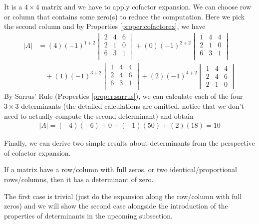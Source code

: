\begin{solution}
It is a $4 \times 4$ matrix and we have to apply cofactor expansion. We can choose row or column that contains some zero(s) to reduce the computation. Here we pick the second column and by Properties \ref{proper:cofactorex}, we have
\begin{align*}
|A| &= (4)(-1)^{1+2}
\begin{vmatrix}
2 & 4 & 6 \\
2 & 1 & 0 \\
6 & 3 & 1 \\
\end{vmatrix}
+ (0)(-1)^{2+2}
\begin{vmatrix}
1 & 4 & 4 \\
2 & 1 & 0 \\
6 & 3 & 1 \\
\end{vmatrix} \\
&\quad + (1)(-1)^{3+2}
\begin{vmatrix}
1 & 4 & 4 \\
2 & 4 & 6 \\
6 & 3 & 1 \\
\end{vmatrix} 
+ (2)(-1)^{4+2}
\begin{vmatrix}
1 & 4 & 4 \\
2 & 4 & 6 \\
2 & 1 & 0
\end{vmatrix} 
\end{align*}
By Sarrus' Rule (Properties \ref{proper:sarrus}), we can calculate each of the four $3 \times 3$ determinants (the detailed calculations are omitted, notice that we don't need to actually compute the second determinant) and obtain
\begin{align*}
|A| = (-4)(-6) + 0 + (-1)(50) + (2)(18) = 10
\end{align*}
\end{solution}
Finally, we can derive two simple results about determinants from the perspective of cofactor expansion.
\begin{proper}
\label{proper:zerodet}
If a matrix have a row/column with full zeros, or two identical/proportional rows/columns, then it has a determinant of zero.
\end{proper}
The first case is trivial (just do the expansion along the row/column with full zeros) and we will show the second case alongside the introduction of the properties of determinants in the upcoming subsection.

